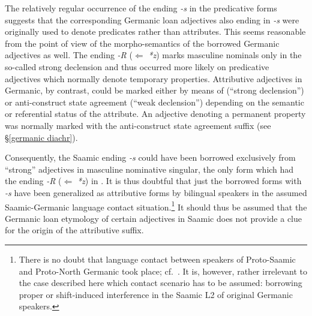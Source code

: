 {The relatively regular occurrence of the ending \textit{-s} in the predicative forms suggests that the corresponding Germanic loan adjectives also ending in \textit{-s} were originally used to denote predicates rather than attributes. This seems reasonable from the point of view of the morpho-semantics of the borrowed Germanic adjectives as well. The ending \textit{-R} ($\Leftarrow$ \textit{*z}) marks masculine nominals only in the so-called strong declension and thus occurred more likely on predicative adjectives which normally denote temporary properties. Attributive adjectives in Germanic, by contrast, could be marked either by means of  (“strong declension”) or anti\hyp{}construct state agreement (“weak declension”) depending on the semantic or referential status of the attribute. An adjective denoting a permanent property was normally marked with the anti\hyp{}construct state agreement suffix (see \S\ref{germanic diachr}).

Consequently, the Saamic ending \textit{-s} could have been borrowed exclusively from “strong” adjectives in masculine nominative singular, the only form which had the ending \textit{-R} ($\Leftarrow$ \textit{*z}) in . It is thus doubtful that just the borrowed forms with \textit{-s} have been generalized as attributive forms by bilingual speakers in the assumed Saamic-Germanic language contact situation.\footnote{There is no doubt that language contact between speakers of Proto\hyp{}Saamic and Proto\hyp{}North Germanic took place; cf.~\citealt{kusmenko2008}. It is, however, rather irrelevant to the case described here which contact scenario has to be assumed: borrowing proper or shift-induced interference in the Saamic L2 of original Germanic speakers.} It should thus be assumed that the Germanic loan etymology of certain adjectives in Saamic does not provide a clue for the origin of the attributive suffix. 

}
